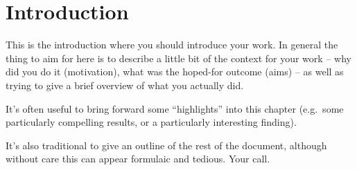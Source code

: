 \chapter{Introduction}

This is the introduction where you should introduce your work. In
general the thing to aim for here is to describe a little bit of the
context for your work -- why did you do it (motivation), what was the
hoped-for outcome (aims) -- as well as trying to give a brief overview
of what you actually did.

It's often useful to bring forward some ``highlights'' into this
chapter (e.g.\ some particularly compelling results, or a particularly
interesting finding).

It's also traditional to give an outline of the rest of the document,
although without care this can appear formulaic and tedious. Your
call.
